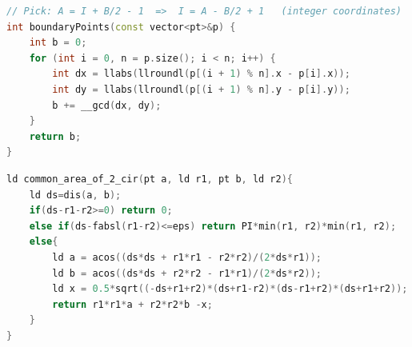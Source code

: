 \begin{lstlisting}[language=C++]
// Pick: A = I + B/2 - 1  =>  I = A - B/2 + 1   (integer coordinates)
int boundaryPoints(const vector<pt>&p) {
    int b = 0;
    for (int i = 0, n = p.size(); i < n; i++) {
        int dx = llabs(llroundl(p[(i + 1) % n].x - p[i].x));
        int dy = llabs(llroundl(p[(i + 1) % n].y - p[i].y));
        b += __gcd(dx, dy);
    }
    return b;
}
\end{lstlisting}

\begin{lstlisting}[language=C++]
ld common_area_of_2_cir(pt a, ld r1, pt b, ld r2){
    ld ds=dis(a, b);
    if(ds-r1-r2>=0) return 0;
    else if(ds-fabsl(r1-r2)<=eps) return PI*min(r1, r2)*min(r1, r2);
    else{
        ld a = acos((ds*ds + r1*r1 - r2*r2)/(2*ds*r1));
        ld b = acos((ds*ds + r2*r2 - r1*r1)/(2*ds*r2));
        ld x = 0.5*sqrt((-ds+r1+r2)*(ds+r1-r2)*(ds-r1+r2)*(ds+r1+r2));
        return r1*r1*a + r2*r2*b -x;
    }
}
\end{lstlisting}




